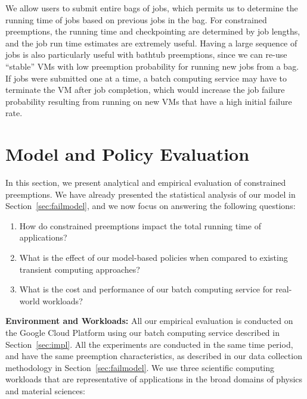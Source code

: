 \documentclass[sigconf]{acmart} %
\newcommand{\subsecspace}[0]{-0.20cm}
\begin{document}
We allow users to submit entire bags of jobs, which permits us to determine the running time of jobs based on previous jobs in the bag.
For constrained preemptions, the running time and checkpointing are determined by job lengths, and the job run time estimates are extremely useful. 
Having a large sequence of jobs is also particularly useful with bathtub preemptions, since we can re-use ``stable'' VMs with low preemption probability for running new jobs from a bag.
If jobs were submitted one at a time, a batch computing service may have to terminate the VM after job completion, which would increase the job failure probability resulting from running on new VMs that have a high initial failure rate. 

\vspace*{\subsecspace}
\section{Model and Policy Evaluation}
\label{sec:eval}

In this section, we present analytical and empirical evaluation of constrained preemptions.
We have already presented the statistical analysis of our model in Section~\ref{sec:failmodel}, and we now focus on answering the following questions: 

\begin{enumerate}
\item How do constrained preemptions impact the total running time of applications?

\item  What is the effect of our model-based policies when compared to existing transient computing approaches?

\item What is the cost and performance of our batch computing service for real-world workloads? 
  
\end{enumerate}

\noindent \textbf{Environment and Workloads:}
All our empirical evaluation is conducted on the Google Cloud Platform using our batch computing service described in Section~\ref{sec:impl}. 
All the experiments are conducted in the same time period, and have the same preemption characteristics, as described in our data collection methodology in  Section~\ref{sec:failmodel}. 
We use three scientific computing workloads that are representative of  applications in the broad domains of physics and material sciences:
\end{document}
